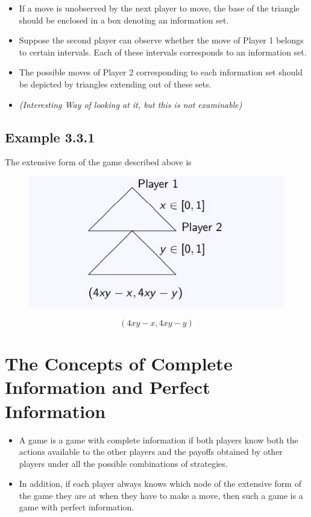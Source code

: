 \documentclass[]{report}
\begin{document}
\begin{itemize}
	\item If a move is unobserved by the next player to move, the base of the
	triangle should be enclosed in a box denoting an information set.
	\item Suppose the second player can observe whether the move of Player
	1 belongs to certain intervals. Each of these intervals corresponds
	to an information set.
	\item  The possible moves of Player 2 corresponding to each information
	set should be depicted by triangles extending out of these sets. 
\item \textit{(Interesting Way of looking at it, but this is not examinable)}
\end{itemize}

\subsection{Example 3.3.1}
The extensive form of the game described above is

\begin{figure}
\centering
\includegraphics[width=0.55\linewidth]{images/DR5-Slide31}
\caption{}
\label{fig:DR5-Slide31}
\end{figure}

\[(4xy − x, 4xy − y)\]
\section{The Concepts of Complete Information and Perfect
	Information}
\begin{itemize}
	\item A game is a game with complete information if both players
	know both the actions available to the other players and the
	payoffs obtained by other players under all the possible
	combinations of strategies.
\item 	In addition, if each player always knows which node of the
	extensive form of the game they are at when they have to make
	a move, then such a game is a game with perfect information.
\end{itemize}
\end{document}
